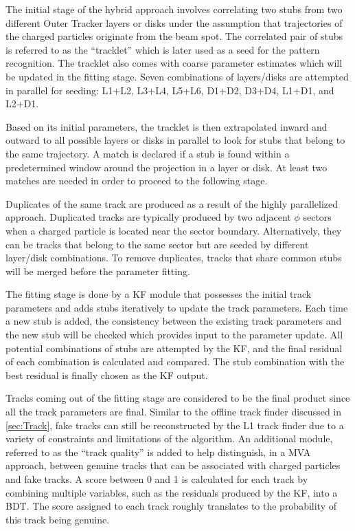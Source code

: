 The initial stage of the hybrid approach involves correlating two stubs from two different Outer Tracker layers or disks under the assumption that trajectories of the charged particles originate from the beam spot. The correlated pair of stubs is referred to as the ``tracklet'' which is later used as a seed for the pattern recognition. The tracklet also comes with coarse parameter estimates which will be updated in the fitting stage. Seven combinations of layers/disks are attempted in parallel for seeding: L1+L2, L3+L4, L5+L6, D1+D2, D3+D4, L1+D1, and L2+D1. 

Based on its initial parameters, the tracklet is then extrapolated inward and outward to all possible layers or disks in parallel to look for stubs that belong to the same trajectory. A match is declared if a stub is found within a predetermined window around the projection in a layer or disk. At least two matches are needed in order to proceed to the following stage. 

Duplicates of the same track are produced as a result of the highly parallelized approach. Duplicated tracks are typically produced by two adjacent $\phi$ sectors when a charged particle is located near the sector boundary. Alternatively, they can be tracks that belong to the same sector but are seeded by different layer/disk combinations. To remove duplicates, tracks that share common stubs will be merged before the parameter fitting. 

The fitting stage is done by a \ac{KF} module that possesses the initial track parameters and adds stubs iteratively to update the track parameters. Each time a new stub is added, the consistency between the existing track parameters and the new stub will be checked which provides input to the parameter update. All potential combinations of stubs are attempted by the \ac{KF}, and the final residual of each combination is calculated and compared. The stub combination with the best residual is finally chosen as the \ac{KF} output. 

Tracks coming out of the fitting stage are considered to be the final product since all the track parameters are final. Similar to the offline track finder discussed in \ref{sec:Track}, fake tracks can still be reconstructed by the \ac{L1} track finder due to a variety of constraints and limitations of the algorithm. An additional module, referred to as the ``track quality'' is added to help distinguish, in a \ac{MVA} approach, between genuine tracks that can be associated with charged particles and fake tracks. A score between 0 and 1 is calculated for each track by combining multiple variables, such as the residuals produced by the \ac{KF}, into a \ac{BDT}. The score assigned to each track roughly translates to the probability of this track being genuine.

